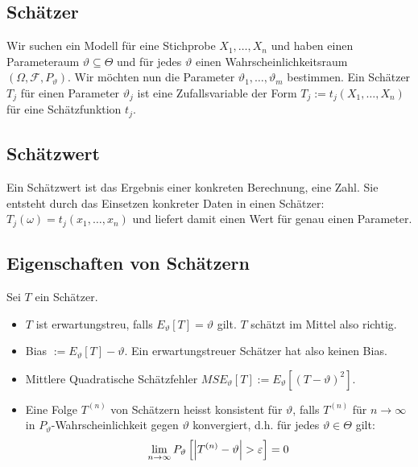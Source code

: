 \documentclass[8pt]{extarticle}
\newcommand{\F}{\mathcal{F}}
\newcommand{\vt}{\vartheta}
\newcommand{\ra}{\rightarrow}
\newcommand{\zufallsvariablen}{X_1, \dots, X_n}
\begin{document}
\begin{multicols*}{3}
  \subsection*{Schätzer}
  Wir suchen ein Modell für eine Stichprobe $\zufallsvariablen$ und haben
  einen Parameteraum $\vartheta \subseteq \varTheta$ und für jedes $\vt$
  einen Wahrscheinlichkeitsraum $(\Omega, \F, P_\vt)$. Wir möchten nun
  die Parameter $\vt_1, \dots, \vt_m$ bestimmen. Ein Schätzer $T_j$ für
  einen Parameter $\vt_j$ ist eine Zufallsvariable der Form
  $T_j := t_j(\zufallsvariablen)$ für eine Schätzfunktion $t_j$.
  \subsection*{Schätzwert}
  Ein Schätzwert ist das Ergebnis einer konkreten Berechnung, eine Zahl.
  Sie entsteht durch das Einsetzen konkreter Daten in einen Schätzer:
  $T_j(\omega) = t_j(x_1, \dots, x_n)$ und liefert damit einen Wert für
  genau einen Parameter.
  \subsection*{Eigenschaften von Schätzern}
  Sei $T$ ein Schätzer.
  \begin{itemize}
    \item $T$ ist erwartungstreu, falls $E_\vt[T] = \vt$ gilt. $T$ schätzt
          im Mittel also richtig.
    \item Bias $:= E_\vt[T] - \vt$. Ein erwartungstreuer
          Schätzer hat also keinen Bias.
    \item Mittlere Quadratische Schätzfehler $MSE_\vt[T] := E_\vt[(T - \vt)^2]$.
    \item Eine Folge $T^{(n)}$ von Schätzern heisst konsistent für $\vt$,
          falls $T^{(n)}$ für $n \ra \infty$ in $P_\vt$-Wahrscheinlichkeit gegen
          $\vt$ konvergiert, d.h. für jedes $\vt \in \varTheta$ gilt:
          \begin{align*}
            \lim_{n \ra \infty} P_\vt \left[ \abs{T^{(n)} - \vt} > \varepsilon \right] = 0
          \end{align*}
  \end{itemize}

\end{multicols*}
\end{document}
